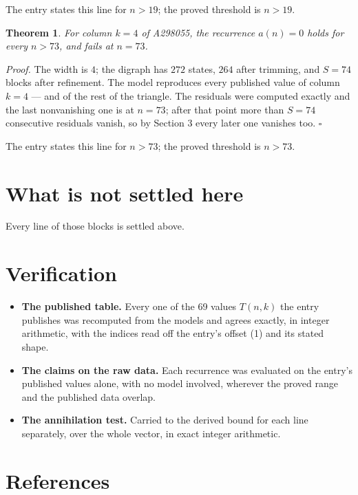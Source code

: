 \documentclass[11pt]{article}
\newtheorem{theorem}{Theorem}
\theoremstyle{definition}
\begin{document}
The entry states this line for $n > 19$; the proved threshold is $n > 19$.

\begin{theorem} For column $k = 4$ of A298055, the recurrence $a(n) = 0$ holds for every $n > 73$, and fails at $n = 73$.\end{theorem}

{\itshape Proof.} The width is $4$; the digraph has $272$ states, $264$ after trimming, and $S = 74$ blocks after refinement. The model reproduces every published value of column $k = 4$ --- and of the rest of the triangle. The residuals were computed exactly and the last nonvanishing one is at $n = 73$; after that point more than $S = 74$ consecutive residuals vanish, so by Section 3 every later one vanishes too. $\square$

The entry states this line for $n > 73$; the proved threshold is $n > 73$.

\section{What is not settled here}

Every line of those blocks is settled above.

\section{Verification}

\begin{itemize}

\item {\bfseries The published table.} Every one of the 69 values $T(n,k)$ the entry publishes was recomputed from the models and agrees exactly, in integer arithmetic, with the indices read off the entry's offset (1) and its stated shape.

\item {\bfseries The claims on the raw data.} Each recurrence was evaluated on the entry's published values alone, with no model involved, wherever the proved range and the published data overlap.

\item {\bfseries The annihilation test.} Carried to the derived bound for each line separately, over the whole vector, in exact integer arithmetic.

\end{itemize}

\section{References}
\end{document}
